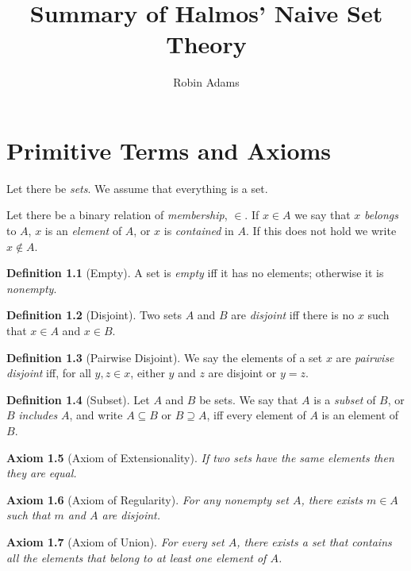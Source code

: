 \documentclass{report}
\title{Summary of Halmos' Naive Set Theory}
\author{Robin Adams}
\newtheorem{ax}{Axiom}[chapter]
\theoremstyle{definition}
\newtheorem{df}[ax]{Definition}
\begin{document}
\maketitle
\tableofcontents

\chapter{Primitive Terms and Axioms}

Let there be \emph{sets}. We assume that everything is a set.

Let there be a binary relation of \emph{membership}, $\in$. If $x \in A$ we say that $x$ \emph{belongs} to $A$, $x$ is an \emph{element} of $A$, or $x$ is \emph{contained} in $A$. If this does not hold we write $x \notin A$.

\begin{df}[Empty]
A set is \emph{empty} iff it has no elements; otherwise it is \emph{nonempty}.
\end{df}

\begin{df}[Disjoint]
Two sets $A$ and $B$ are \emph{disjoint} iff there is no $x$ such that $x \in A$ and $x \in B$.
\end{df}

\begin{df}[Pairwise Disjoint]
We say the elements of a set $x$ are \emph{pairwise disjoint} iff, for all $y,z \in x$, either $y$ and $z$ are disjoint or $y = z$.
\end{df}

\begin{df}[Subset]
Let $A$ and $B$ be sets. We say that $A$ is a \emph{subset} of $B$, or $B$ \emph{includes} $A$, and write $A \subseteq B$ or $B \supseteq A$, iff every element of $A$ is an element of $B$.
\end{df}

\begin{ax}[Axiom of Extensionality]
If two sets have the same elements then they are equal.
\end{ax}

\begin{ax}[Axiom of Regularity]
For any nonempty set $A$, there exists $m \in A$ such that $m$ and $A$ are disjoint.
\end{ax}

\begin{ax}[Axiom of Union]
For every set $A$, there exists a set that contains all the elements that belong to at least one element of $A$.
\end{ax}
\end{document}
